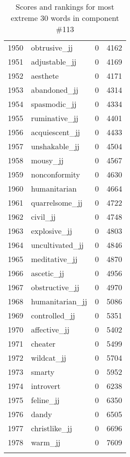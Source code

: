 \begin{longtable}[!htbp]{| rlr@{.}l |}
    1950 & obtrusive\_jj & 0 & 4162 \\
    1951 & adjustable\_jj & 0 & 4169 \\
    1952 & aesthete & 0 & 4171 \\
    1953 & abandoned\_jj & 0 & 4314 \\
    1954 & spasmodic\_jj & 0 & 4334 \\
    1955 & ruminative\_jj & 0 & 4401 \\
    1956 & acquiescent\_jj & 0 & 4433 \\
    1957 & unshakable\_jj & 0 & 4504 \\
    1958 & mousy\_jj & 0 & 4567 \\
    1959 & nonconformity & 0 & 4630 \\
    1960 & humanitarian & 0 & 4664 \\
    1961 & quarrelsome\_jj & 0 & 4722 \\
    1962 & civil\_jj & 0 & 4748 \\
    1963 & explosive\_jj & 0 & 4803 \\
    1964 & uncultivated\_jj & 0 & 4846 \\
    1965 & meditative\_jj & 0 & 4870 \\
    1966 & ascetic\_jj & 0 & 4956 \\
    1967 & obstructive\_jj & 0 & 4970 \\
    1968 & humanitarian\_jj & 0 & 5086 \\
    1969 & controlled\_jj & 0 & 5351 \\
    1970 & affective\_jj & 0 & 5402 \\
    1971 & cheater & 0 & 5499 \\
    1972 & wildcat\_jj & 0 & 5704 \\
    1973 & smarty & 0 & 5952 \\
    1974 & introvert & 0 & 6238 \\
    1975 & feline\_jj & 0 & 6350 \\
    1976 & dandy & 0 & 6505 \\
    1977 & christlike\_jj & 0 & 6696 \\
    1978 & warm\_jj & 0 & 7609 \\
    \hline
    \caption{Scores and rankings for most extreme 30 words in component \#113} \\
\end{longtable}
